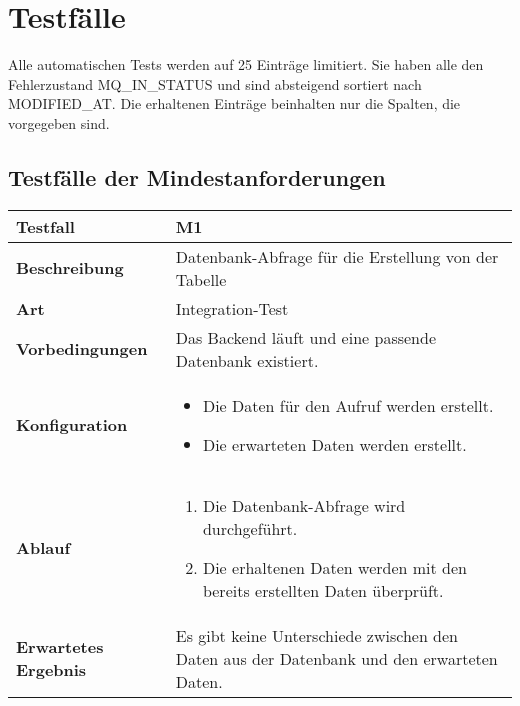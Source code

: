 \section{Testfälle}
Alle automatischen Tests werden auf 25 Einträge limitiert. Sie haben alle den Fehlerzustand MQ\_IN\_STATUS und sind absteigend sortiert nach MODIFIED\_AT. Die erhaltenen Einträge beinhalten nur die Spalten, die vorgegeben sind.

\subsection{Testfälle der Mindestanforderungen}

\begin{longtable}{p{}|p{}}
	\hline
	\textbf{Testfall}               & \textbf{M1} \\
	\hline
	\textbf{Beschreibung}   		& Datenbank-Abfrage für die Erstellung von der Tabelle \\
	\hline
	\textbf{Art}    				& Integration-Test \\
	\hline
	\textbf{Vorbedingungen}    		& Das Backend läuft und eine passende Datenbank existiert. \\
	\hline
	\textbf{Konfiguration}   	 	& 
	\begin{itemize}
		\item Die Daten für den Aufruf werden erstellt.
		\item Die erwarteten Daten werden erstellt.
	\end{itemize} \\
	\hline
	\textbf{Ablauf}    				& 
	\begin{enumerate}
		\item Die Datenbank-Abfrage wird durchgeführt.
		\item Die erhaltenen Daten werden mit den bereits erstellten Daten überprüft.
	\end{enumerate} \\
	\hline
	\textbf{Erwartetes Ergebnis}    & Es gibt keine Unterschiede zwischen den Daten aus der Datenbank und den erwarteten Daten.  \\
	\hline
\end{longtable}\label{tab:testfall-M1}

